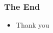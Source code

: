 \documentclass{beamer}
\newcommand{\red}[1]{\textcolor{red}{#1}}
\begin{document}
\begin{frame}
    \frametitle{The End}
    
    \begin{itemize}
        \item  Thank you
    \end{itemize}

\end{frame}


%
\end{document}
